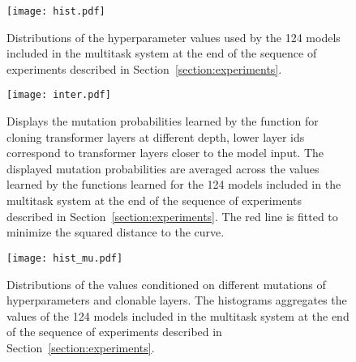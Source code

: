 \documentclass{article} \usepackage{iclr2023_conference,times}
\begin{document}
\begin{figure}[h]
\centering
\texttt{[image: hist.pdf]}
\caption{Distributions of the hyperparameter values used by the 124 models included in the multitask system at the end of the sequence of experiments described in Section~\ref{section:experiments}.
}
\label{fig:dists}
\end{figure}

\begin{figure}[h]
\centering
\texttt{[image: inter.pdf]}
\caption{Displays the mutation probabilities learned by the  function for cloning transformer layers at different depth, lower layer ids correspond to transformer layers closer to the model input.
The displayed mutation probabilities are averaged across the values learned by the  functions learned for the 124 models included in the multitask system at the end of the sequence of experiments described in Section~\ref{section:experiments}.
The red line is fitted to minimize the squared distance to the curve.
}
\label{fig:clone-prob}
\end{figure}

\begin{figure}[h]
\centering
\texttt{[image: hist\_mu.pdf]}
\caption{Distributions of the  values conditioned on different mutations of hyperparameters and clonable layers.
The histograms aggregates the values of the 124 models included in the multitask system at the end of the sequence of experiments described in Section~\ref{section:experiments}. 
}
\label{fig:dists_mu}
\end{figure}
\end{document}
